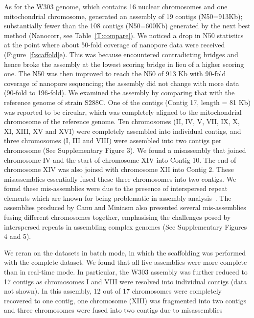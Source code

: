 As for the \sce{} W303 genome, which contains 16 nuclear chromosomes and one 
mitochondrial chromosome, \npscarf{} generated an assembly of 19 contigs (N50=913Kb); 
substantially fewer than 
the 108 contigs (N50=600Kb) generated by the next best method (Nanocorr, 
see Table~\ref{T:compare}).
We noticed a drop in N50 statistics at the point where about 50-fold coverage 
of nanopore data were received (Figure~\ref{f:scaffold}e). This was because
\npscarf{} encountered contradicting bridges and hence broke the assembly at 
the lowest scoring bridge in lieu of a higher scoring one. The N50 was then 
improved to reach the N50 of 913 Kb with 90-fold coverage of nanopore sequencing; 
the assembly did not change with more data (90-fold to 196-fold). 
We examined the assembly by comparing that with the reference genome of \sce{}
strain S288C. One of the contigs (Contig 17,
length = 81 Kb) was reported to be circular, which was completely aligned to the 
mitochondrial chromosome of the reference genome. Ten chromosomes (II,
IV, V, VII, IX, X, XI, XIII, XV and XVI) were completely assembled into individual
contigs, and three chromosomes (I, III and VIII) were assembled into two contigs per 
chromosome (See Supplementary Figure 3). We found a misassembly that joined
chromosome IV and the start of chromosome XIV into Contig 10. The end of
chromosome XIV was also joined with chromosome XII into Contig 2. These
misassemblies essentially fused these three chromosomes into two contigs.
We found these mis-assemblies were due to the presence of interspersed repeat
elements which are known for being problematic in assembly
analysis~\cite{TreangenS2012}. The assemblies produced by Canu and Miniasm also
presented several mis-assemblies fusing different chromosomes together, 
emphasising the challenges posed by interspersed repeats in assembling complex 
genomes (See Supplementary Figures 4 and 5).


We reran \npscarf{} on the datasets in batch mode, in which the scaffolding was
performed with the complete dataset. We found that all five assemblies were  
more complete than in real-time mode. In particular, the \sce{} W303
assembly was further reduced to 17 contigs as chromosomes I and VIII were 
resolved into individual contigs (data not shown). In this assembly, 12 out of
17 chromosomes were completely recovered to one contig, one chromosome (XIII)
was fragmented into two contigs and three chromosomes were fused into two
contigs due to misassemblies



